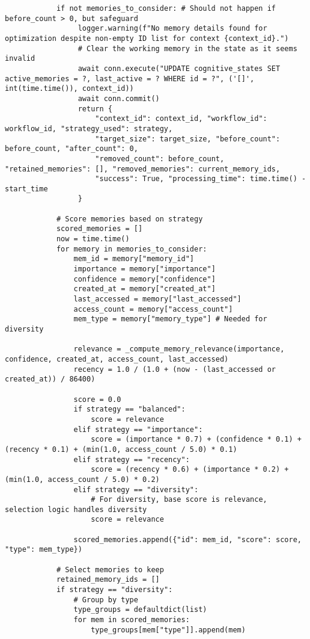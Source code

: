 \documentclass[12pt,a4paper]{article}
\begin{document}
\begin{pageablecode}
\begin{verbatim}
            if not memories_to_consider: # Should not happen if before_count > 0, but safeguard
                 logger.warning(f"No memory details found for optimization despite non-empty ID list for context {context_id}.")
                 # Clear the working memory in the state as it seems invalid
                 await conn.execute("UPDATE cognitive_states SET active_memories = ?, last_active = ? WHERE id = ?", ('[]', int(time.time()), context_id))
                 await conn.commit()
                 return {
                     "context_id": context_id, "workflow_id": workflow_id, "strategy_used": strategy,
                     "target_size": target_size, "before_count": before_count, "after_count": 0,
                     "removed_count": before_count, "retained_memories": [], "removed_memories": current_memory_ids,
                     "success": True, "processing_time": time.time() - start_time
                 }

            # Score memories based on strategy
            scored_memories = []
            now = time.time()
            for memory in memories_to_consider:
                mem_id = memory["memory_id"]
                importance = memory["importance"]
                confidence = memory["confidence"]
                created_at = memory["created_at"]
                last_accessed = memory["last_accessed"]
                access_count = memory["access_count"]
                mem_type = memory["memory_type"] # Needed for diversity

                relevance = _compute_memory_relevance(importance, confidence, created_at, access_count, last_accessed)
                recency = 1.0 / (1.0 + (now - (last_accessed or created_at)) / 86400)

                score = 0.0
                if strategy == "balanced":
                    score = relevance
                elif strategy == "importance":
                    score = (importance * 0.7) + (confidence * 0.1) + (recency * 0.1) + (min(1.0, access_count / 5.0) * 0.1)
                elif strategy == "recency":
                    score = (recency * 0.6) + (importance * 0.2) + (min(1.0, access_count / 5.0) * 0.2)
                elif strategy == "diversity":
                    # For diversity, base score is relevance, selection logic handles diversity
                    score = relevance

                scored_memories.append({"id": mem_id, "score": score, "type": mem_type})

            # Select memories to keep
            retained_memory_ids = []
            if strategy == "diversity":
                # Group by type
                type_groups = defaultdict(list)
                for mem in scored_memories:
                    type_groups[mem["type"]].append(mem)


\end{verbatim}
\end{pageablecode}
\end{document}
